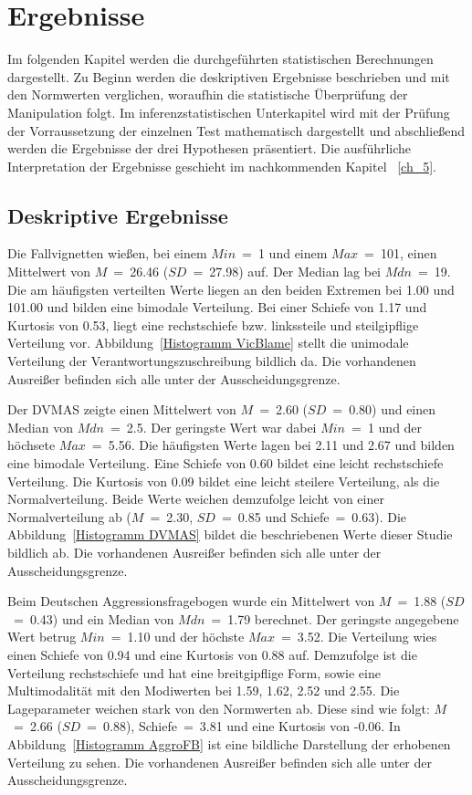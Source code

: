 \chapter{Ergebnisse}   \label{ch_4}
Im folgenden Kapitel werden die durchgeführten statistischen Berechnungen dargestellt. Zu Beginn werden die deskriptiven Ergebnisse beschrieben und mit den Normwerten verglichen, woraufhin die statistische Überprüfung der Manipulation folgt. Im inferenzstatistischen Unterkapitel wird mit der Prüfung der Vorraussetzung der einzelnen Test mathematisch dargestellt und abschließend werden die Ergebnisse der drei Hypothesen präsentiert. Die ausführliche Interpretation der Ergebnisse geschieht im nachkommenden Kapitel ~\ref{ch_5}.

\section{Deskriptive Ergebnisse}    \label{sec_4.1}
Die Fallvignetten wießen, bei einem $Min$~=~1 und einem $Max$~=~101, einen Mittelwert von $M$~=~26.46 ($SD$~=~27.98) auf. Der Median lag bei $Mdn$~=~19. Die am häufigsten verteilten Werte liegen an den beiden Extremen bei 1.00 und 101.00 und bilden eine bimodale Verteilung. Bei einer Schiefe von 1.17 und Kurtosis von 0.53, liegt eine rechstschiefe bzw. linkssteile und steilgipflige Verteilung vor. Abbildung~\ref{Histogramm VicBlame} stellt die unimodale Verteilung der Verantwortungszuschreibung bildlich da. Die vorhandenen Ausreißer befinden sich alle unter der Ausscheidungsgrenze.


Der DVMAS zeigte einen Mittelwert von $M$~=~2.60 ($SD$~=~0.80) und einen Median von $Mdn$~=~2.5. Der geringste Wert war dabei $Min$~=~1 und der höchsete $Max$~=~5.56. Die häufigsten Werte lagen bei 2.11 und 2.67 und bilden eine bimodale Verteilung. Eine Schiefe von 0.60 bildet eine leicht rechstschiefe Verteilung. Die Kurtosis von 0.09 bildet eine leicht steilere Verteilung, als die Normalverteilung. Beide Werte weichen demzufolge leicht von einer Normalverteilung ab ($M$~=~2.30, $SD$~=~0.85 und Schiefe~=~0.63). 
Die Abbildung~\ref{Histogramm DVMAS} bildet die beschriebenen Werte dieser Studie bildlich ab. Die vorhandenen Ausreißer befinden sich alle unter der Ausscheidungsgrenze.



Beim Deutschen Aggressionsfragebogen wurde ein Mittelwert von $M$~=~1.88 ($SD$~=~0.43) und ein Median von $Mdn$~=~1.79 berechnet. Der geringste angegebene Wert betrug $Min$~=~1.10 und der höchste $Max$~=~3.52. Die Verteilung wies einen Schiefe von 0.94 und eine Kurtosis von 0.88 auf. Demzufolge ist die Verteilung rechstschiefe und hat eine breitgipflige Form, sowie eine Multimodalität mit den Modiwerten bei 1.59, 1.62, 2.52 und 2.55. Die Lageparameter weichen stark von den Normwerten ab. Diese sind wie folgt: $M$~=~2.66 ($SD$~=~0.88), Schiefe~=~3.81 und eine Kurtosis von -0.06. In Abbildung~\ref{Histogramm AggroFB} ist eine bildliche Darstellung der erhobenen Verteilung zu sehen. Die vorhandenen Ausreißer befinden sich alle unter der Ausscheidungsgrenze.


